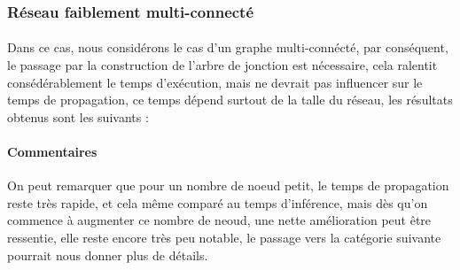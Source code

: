 \documentclass[]{report}
\begin{document}
	\subsubsection{Réseau faiblement multi-connecté}
	\paragraph{}
	Dans ce cas, nous considérons le cas d'un graphe multi-connécté, par conséquent, le passage par la construction de l'arbre de jonction
	est nécessaire, cela ralentit consédérablement le temps d'exécution, mais ne devrait pas influencer
	sur le temps de propagation, ce temps dépend surtout de la talle du réseau, les résultats obtenus sont les suivants :

	\begin{table}[H]
	\centering
	\end{table}


	\paragraph{Commentaires}
	On peut remarquer que pour un nombre de noeud petit, le temps de propagation reste très rapide, et cela même comparé au
	temps d'inférence, mais dès qu'on commence à augmenter ce nombre de neoud, une nette amélioration peut être ressentie, elle
	reste encore très peu notable, le passage vers la catégorie suivante pourrait nous donner plus de détails.
\end{document}
